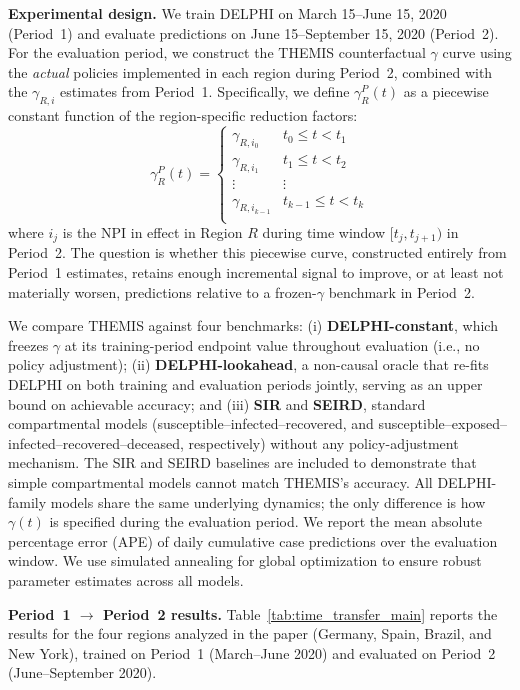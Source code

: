 \documentclass[letterpaper,twoside,11pt]{reviewresponse}
\begin{document}
\begin{enumerate}
    \textbf{Experimental design.} We train DELPHI on March 15--June 15, 2020 (Period~1) and evaluate predictions on June 15--September 15, 2020 (Period~2). For the evaluation period, we construct the THEMIS counterfactual $\gamma$ curve using the \emph{actual} policies implemented in each region during Period~2, combined with the $\gamma_{R,i}$ estimates from Period~1. Specifically, we define $\gamma_R^P(t)$ as a piecewise constant function of the region-specific reduction factors:
    \begin{equation}
    	\gamma_R^P(t)=\begin{cases}
    		\gamma_{R,i_0} & t_0\leq t<t_1\\
    		\gamma_{R,i_1} & t_1\leq t<t_2\\ 
    		\vdots & \vdots \\
    		\gamma_{R,i_{k-1}} & t_{k-1}\leq t<t_k\\ 
    	\end{cases}
    \end{equation}
    where $i_j$ is the NPI in effect in Region $R$ during time window $[t_j, t_{j+1})$ in Period~2. The question is whether this piecewise curve, constructed entirely from Period~1 estimates, retains enough incremental signal to improve, or at least not materially worsen, predictions relative to a frozen-$\gamma$ benchmark in Period~2.
    
    We compare THEMIS against four benchmarks: (i) \textbf{DELPHI-constant}, which freezes $\gamma$ at its training-period endpoint value throughout evaluation (i.e., no policy adjustment); (ii) \textbf{DELPHI-lookahead}, a non-causal oracle that re-fits DELPHI on both training and evaluation periods jointly, serving as an upper bound on achievable accuracy; and (iii) \textbf{SIR} and \textbf{SEIRD}, standard compartmental models (susceptible--infected--recovered, and susceptible--exposed--infected--recovered--deceased, respectively) without any policy-adjustment mechanism. The SIR and SEIRD baselines are included to demonstrate that simple compartmental models cannot match THEMIS's accuracy. All DELPHI-family models share the same underlying dynamics; the only difference is how $\gamma(t)$ is specified during the evaluation period. We report the mean absolute percentage error (APE) of daily cumulative case predictions over the evaluation window. We use simulated annealing for global optimization to ensure robust parameter estimates across all models.
    
	\textbf{Period~1 $\to$ Period~2 results.} Table~\ref{tab:time_transfer_main} reports the results for the four regions analyzed in the paper (Germany, Spain, Brazil, and New York), trained on Period~1 (March--June 2020) and evaluated on Period~2 (June--September 2020).
    

\end{enumerate}
\end{document}
